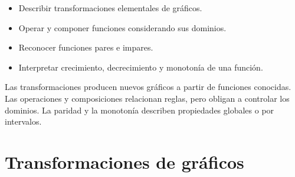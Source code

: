 \ifdefined\documentoSemanal
\else
\usepackage{tikz}
\usepackage{estilo_apuntes}
\usetikzlibrary{babel}


\fi

\ifdefined\documentoSemanal
\else
{}

\begin{objetivos}
\begin{itemize}
  \item Describir transformaciones elementales de gráficos.
  \item Operar y componer funciones considerando sus dominios.
  \item Reconocer funciones pares e impares.
  \item Interpretar crecimiento, decrecimiento y monotonía de una función.
\end{itemize}
\end{objetivos}

\begin{resumen}
Las transformaciones producen nuevos gráficos a partir de funciones conocidas. Las operaciones y composiciones relacionan reglas, pero obligan a controlar los dominios. La paridad y la monotonía describen propiedades globales o por intervalos.
\end{resumen}
\fi

\section*{Transformaciones de gráficos}

